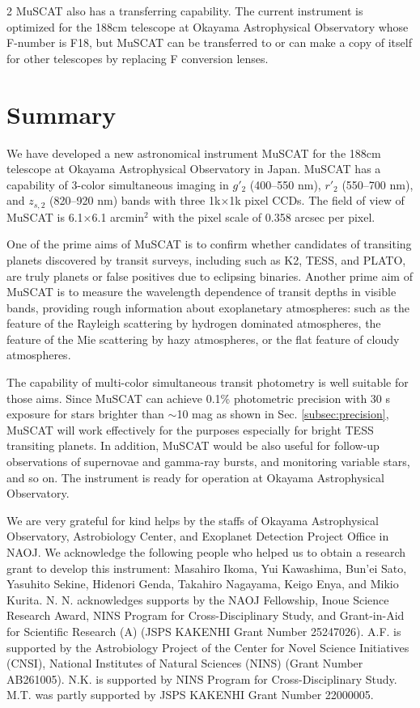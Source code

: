 \documentclass[a4paper,12pt]{spieman}  %
\begin{document}
\begin{spacing}{2}
MuSCAT also has a transferring capability.
The current instrument is optimized for the 188cm telescope at Okayama Astrophysical Observatory
whose F-number is F18, but MuSCAT can be transferred to or can make a copy of itself for
other telescopes by replacing F conversion lenses.


\section{Summary}
\label{sect:summary}  %

We have developed a new astronomical instrument MuSCAT for the 188cm telescope
at Okayama Astrophysical Observatory in Japan.
MuSCAT has a capability of 3-color simultaneous imaging in 
$g'_2$ (400--550 nm), $r'_2$ (550--700 nm), and $z_{s,2}$ (820--920 nm) bands
with three 1k$\times$1k pixel CCDs.
The field of view of MuSCAT is 6.1$\times$6.1 arcmin$^2$
with the pixel scale of 0.358 arcsec per pixel.

One of the prime aims of MuSCAT is to confirm whether candidates of transiting planets
discovered by transit surveys, including such as K2, TESS, and PLATO,
are truly planets or false positives due to eclipsing binaries.
Another prime aim of MuSCAT is to measure the wavelength dependence of transit depths in visible bands,
providing rough information about exoplanetary atmospheres:
such as the feature of the Rayleigh scattering by hydrogen dominated atmospheres,
the feature of the Mie scattering by hazy atmospheres, or the flat feature of cloudy
atmospheres\cite{2012ApJ...756..176H,2013ApJ...770...95F}.

The capability of multi-color simultaneous transit photometry is well suitable for those aims.
Since MuSCAT can achieve 0.1\% photometric precision with 30 s exposure
for stars brighter than $\sim$10 mag
as shown in Sec. \ref{subsec:precision}, MuSCAT will work effectively for the purposes
especially for bright TESS transiting planets.
In addition, MuSCAT would be also useful for follow-up observations of supernovae and
gamma-ray bursts, and monitoring variable stars, and so on.
The instrument is ready for operation at Okayama Astrophysical Observatory.

\bigskip
\acknowledgments 

We are very grateful for kind helps by the staffs of Okayama Astrophysical Observatory,
Astrobiology Center, and Exoplanet Detection Project Office in NAOJ.
We acknowledge the following people who helped us to obtain a research grant to
develop this instrument:
Masahiro Ikoma, Yui Kawashima, Bun'ei Sato, Yasuhito Sekine,
Hidenori Genda, Takahiro Nagayama, Keigo Enya, and Mikio Kurita.
N. N. acknowledges supports by the NAOJ Fellowship,
Inoue Science Research Award, NINS Program for Cross-Disciplinary Study,
and Grant-in-Aid for Scientific Research (A) (JSPS KAKENHI Grant Number 25247026).
A.F. is supported by the Astrobiology Project of the Center for Novel Science Initiatives (CNSI),
National Institutes of Natural Sciences (NINS) (Grant Number AB261005).
N.K. is supported by NINS Program for Cross-Disciplinary Study.
M.T. was partly supported by JSPS KAKENHI Grant Number 22000005.


\end{spacing}
\end{document}
